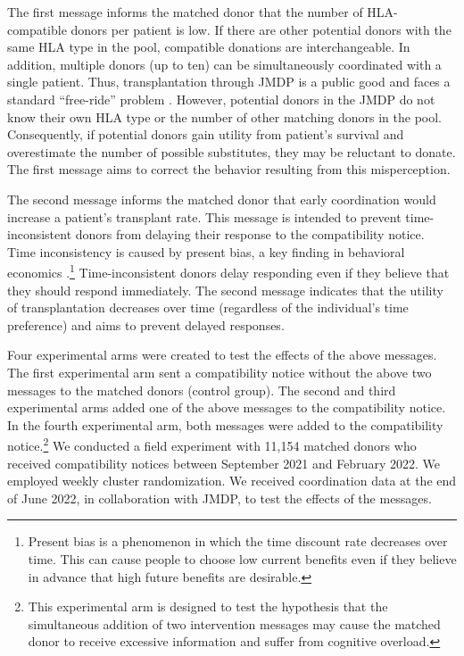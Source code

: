 \documentclass[12pt, a4paper]{article}
\begin{document}
The first message informs the matched donor that the number of HLA-compatible donors per patient is low. If there are other potential donors with the same HLA type in the pool, compatible donations are interchangeable. In addition, multiple donors (up to ten) can be simultaneously coordinated with a single patient. Thus, transplantation through JMDP is a public good and faces a standard ``free-ride'' problem \citep{Bergstrom2009}. However, potential donors in the JMDP do not know their own HLA type or the number of other matching donors in the pool. Consequently, if potential donors gain utility from patient's survival and overestimate the number of possible substitutes, they may be reluctant to donate. The first message aims to correct the behavior resulting from this misperception.

The second message informs the matched donor that early coordination would increase a patient's transplant rate. This message is intended to prevent time-inconsistent donors from delaying their response to the compatibility notice. Time inconsistency is caused by present bias, a key finding in behavioral economics \citep{Laibson1997, ODonoghue2001}.\footnote{Present bias is a phenomenon in which the time discount rate decreases over time. This can cause people to choose low current benefits even if they believe in advance that high future benefits are desirable.} Time-inconsistent donors delay responding even if they believe that they should respond immediately. The second message indicates that the utility of transplantation decreases over time (regardless of the individual's time preference) and aims to prevent delayed responses.

Four experimental arms were created to test the effects of the above messages. The first experimental arm sent a compatibility notice without the above two messages to the matched donors (control group). The second and third experimental arms added one of the above messages to the compatibility notice. In the fourth experimental arm, both messages were added to the compatibility notice.\footnote{This experimental arm is designed to test the hypothesis that the simultaneous addition of two intervention messages may cause the matched donor to receive excessive information and suffer from cognitive overload.} We conducted a field experiment with 11,154 matched donors who received compatibility notices between September 2021 and February 2022. We employed weekly cluster randomization. We received coordination data at the end of June 2022, in collaboration with JMDP, to test the effects of the messages.
\end{document}
